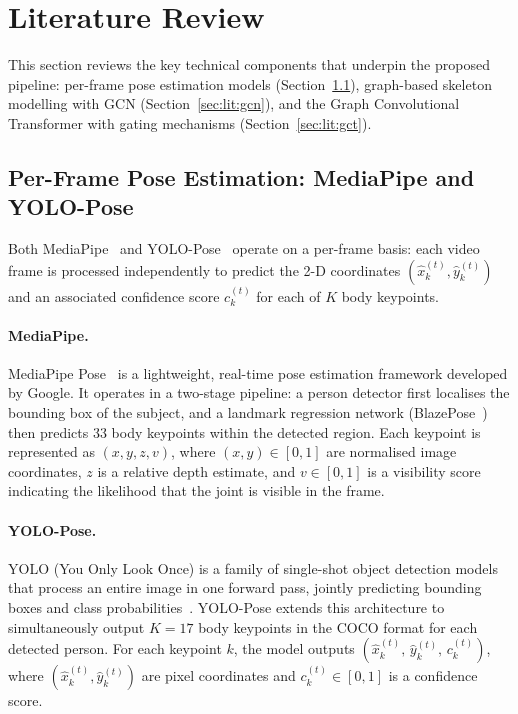 \documentclass{article}
\begin{document}
\section{Literature Review}
\label{sec:literature}

This section reviews the key technical components that underpin the proposed
pipeline: per-frame pose estimation models (Section~\ref{sec:lit:pose}),
graph-based skeleton modelling with GCN (Section~\ref{sec:lit:gcn}),
and the Graph Convolutional Transformer with gating mechanisms
(Section~\ref{sec:lit:gct}).

\subsection{Per-Frame Pose Estimation: MediaPipe and YOLO-Pose}
\label{sec:lit:pose}

Both MediaPipe~\cite{lugaresi2019mediapipe} and YOLO-Pose~\cite{maji2022yolopose}
operate on a per-frame basis: each video frame is processed independently to
predict the 2-D coordinates $(\hat{x}_k^{(t)}, \hat{y}_k^{(t)})$ and an
associated confidence score $c_k^{(t)}$ for each of $K$ body keypoints.

\paragraph{MediaPipe.}
MediaPipe Pose~\cite{lugaresi2019mediapipe} is a lightweight, real-time
pose estimation framework developed by Google.
It operates in a two-stage pipeline: a person detector first localises
the bounding box of the subject, and a landmark regression network
(BlazePose~\cite{bazarevsky2020blazepose}) then predicts 33 body
keypoints within the detected region.
Each keypoint is represented as $(x, y, z, v)$, where
$(x, y) \in [0,1]$ are normalised image coordinates, $z$ is a relative
depth estimate, and $v \in [0,1]$ is a visibility score indicating the
likelihood that the joint is visible in the frame.

\paragraph{YOLO-Pose.}
YOLO (You Only Look Once) is a family of single-shot object detection
models that process an entire image in one forward pass, jointly predicting
bounding boxes and class probabilities~\cite{maji2022yolopose}.
YOLO-Pose extends this architecture to simultaneously output $K = 17$ body
keypoints in the COCO format for each detected person.
For each keypoint $k$, the model outputs
$(\hat{x}_k^{(t)},\, \hat{y}_k^{(t)},\, c_k^{(t)})$,
where $(\hat{x}_k^{(t)}, \hat{y}_k^{(t)})$ are pixel coordinates and
$c_k^{(t)} \in [0,1]$ is a confidence score.
\end{document}
